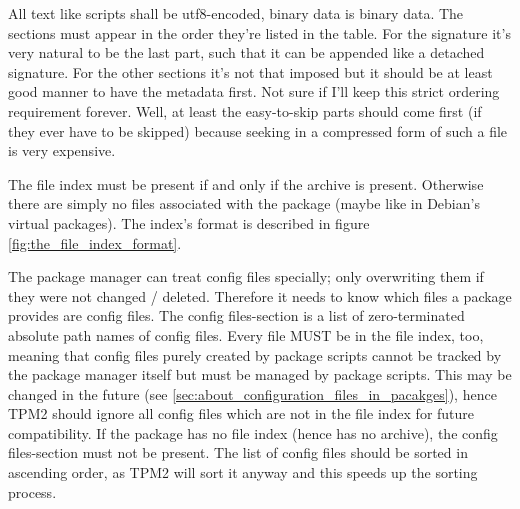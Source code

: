 \documentclass[a4paper]{scrartcl}
\begin{document}
	\vspace{1eM}
	
	All text like scripts shall be utf8-encoded, binary data is binary data. The sections must appear in the order they're listed in the table. For the signature it's very natural to be the last part, such that it can be appended like a detached signature. For the other sections it's not that imposed but it should be at least good manner to have the metadata first. Not sure if I'll keep this strict ordering requirement forever. Well, at least the easy-to-skip parts should come first (if they ever have to be skipped) because seeking in a compressed form of such a file is very expensive.
	
	The file index must be present if and only if the archive is present. Otherwise there are simply no files associated with the package (maybe like in Debian's virtual packages). The index's format is described in figure \ref{fig:the_file_index_format}.
	
	The package manager can treat config files specially; only overwriting them if they were not changed / deleted. Therefore it needs to know which files a package provides are config files. The config files-section is a list of zero-terminated absolute path names of config files. Every file MUST be in the file index, too, meaning that config files purely created by package scripts cannot be tracked by the package manager itself but must be managed by package scripts. This may be changed in the future (see \ref{sec:about_configuration_files_in_pacakges}), hence TPM2 should ignore all config files which are not in the file index for future compatibility. If the package has no file index (hence has no archive), the config files-section must not be present. The list of config files should be sorted in ascending order, as TPM2 will sort it anyway and this speeds up the sorting process.
	
\end{document}
